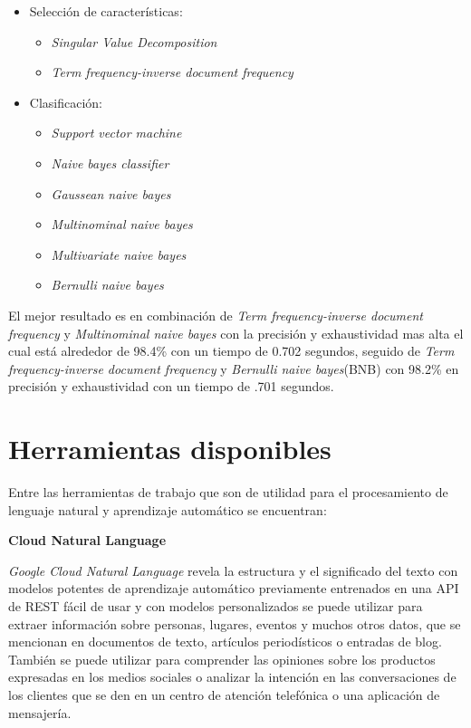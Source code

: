 \begin{itemize}
	\item Selección de características:
	\begin{itemize}
		\item \textit{Singular Value Decomposition}
		\item \textit{Term frequency-inverse document frequency}
	\end{itemize}

	\item Clasificación:
	\begin{itemize}
		\item \textit{Support vector machine}
		\item \textit{Naive bayes classifier}
		\item \textit{Gaussean naive bayes}
		\item \textit{Multinominal naive bayes}
		\item \textit{Multivariate naive bayes}
		\item \textit{Bernulli naive bayes}
	\end{itemize}
\end{itemize}

 El mejor resultado es en combinación de \textit{Term frequency-inverse document frequency} y  \textit{Multinominal naive bayes} con la precisión y exhaustividad mas alta el cual está alrededor de 98.4\% con un tiempo de 0.702 segundos, seguido de \textit{Term frequency-inverse document frequency} y \textit{Bernulli naive bayes}(BNB)  con 98.2\% en precisión y exhaustividad con un tiempo de .701 segundos.



\section[Herramientas d.]{Herramientas disponibles}


Entre las herramientas de trabajo que son de utilidad para el procesamiento de lenguaje natural y aprendizaje automático se encuentran:\\

\begin{large}
	 \textbf{Cloud Natural Language}\\
\end{large} 

\textit{Google Cloud Natural Language} \citep{CD12}   revela la estructura y el significado del texto con modelos potentes de aprendizaje automático previamente entrenados en una API de REST fácil de usar y con modelos personalizados se puede utilizar para extraer información sobre personas, lugares, eventos y muchos otros datos, que se mencionan en documentos de texto, artículos periodísticos o entradas de blog. También se puede utilizar para comprender las opiniones sobre los productos expresadas en los medios sociales o analizar la intención en las conversaciones de los clientes que se den en un centro de atención telefónica o una aplicación de mensajería.\\

